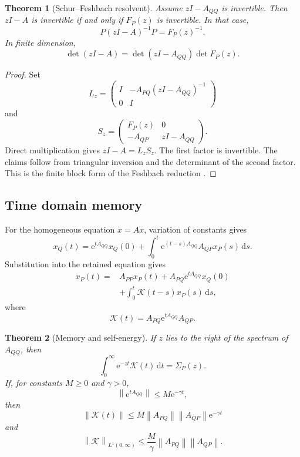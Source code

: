 \documentclass[11pt,letterpaper]{article}
\newtheorem{theorem}{Theorem}[section]
\theoremstyle{plain}
\theoremstyle{plain}
\theoremstyle{plain}
\theoremstyle{definition}
\theoremstyle{definition}
\theoremstyle{definition}
\theoremstyle{definition}
\theoremstyle{definition}
\theoremstyle{remark}
\theoremstyle{remark}
\theoremstyle{remark}
\theoremstyle{remark}
\theoremstyle{remark}
\newcommand{\norm}[1]{\left\lVert#1\right\rVert}
\theoremstyle{remark}
\newcommand{\Kcal}{\mathcal K}
\newcommand{\e}{\mathrm e}
\newcommand{\dd}{\,\mathrm d}
\let\KomorebiPrimitiveMathcal\mathcal
\renewcommand{\mathcal}[1]{{\KomorebiPrimitiveMathcal{#1}}}
\let\KomorebiPrimitivemathrm\mathrm
\renewcommand{\mathrm}[1]{{\KomorebiPrimitivemathrm{#1}}}
\begin{document}
\begin{theorem}[Schur--Feshbach resolvent]\label{extended:record:085}\label{extended:thm:feshbach_resolvent}
Assume \(zI-A_{QQ}\) is invertible. Then \(zI-A\) is invertible if and only if \(F_P(z)\) is invertible. In that case,
\[
P(zI-A)^{-1}P
=
F_P(z)^{-1}.
\]
In finite dimension,
\[
\det(zI-A)
=
\det(zI-A_{QQ})\det F_P(z).
\]
\end{theorem}

\begin{proof}
Set
\[
L_z=
\begin{pmatrix}
I&-A_{PQ}(zI-A_{QQ})^{-1}\\
0&I
\end{pmatrix}
\]
and
\[
S_z=
\begin{pmatrix}
F_P(z)&0\\
-A_{QP}&zI-A_{QQ}
\end{pmatrix}.
\]
Direct multiplication gives \(zI-A=L_zS_z\). The first factor is invertible. The claims follow from triangular inversion and the determinant of the second factor. This is the finite block form of the Feshbach reduction \cite{Feshbach1958}.
\end{proof}

\subsection{Time domain memory}

For the homogeneous equation \(\dot x=Ax\), variation of constants gives
\[
x_Q(t)
=
\e^{tA_{QQ}}x_Q(0)
+
\int_0^t
\e^{(t-s)A_{QQ}}A_{QP}x_P(s)
\dd s.
\]
Substitution into the retained equation gives
\[
\begin{aligned}
\dot x_P(t)
={}&
A_{PP}x_P(t)
+
A_{PQ}\e^{tA_{QQ}}x_Q(0)\\
&+
\int_0^t
\Kcal(t-s)x_P(s)
\dd s,
\end{aligned}
\]
where
\[
\Kcal(t)
=
A_{PQ}\e^{tA_{QQ}}A_{QP}.
\]

\begin{theorem}[Memory and self-energy]\label{extended:record:086}\label{extended:thm:memory_self_energy}
If \(z\) lies to the right of the spectrum of \(A_{QQ}\), then
\[
\int_0^\infty
\e^{-zt}\Kcal(t)\dd t
=
\Sigma_P(z).
\]
If, for constants \(M\geq0\) and \(\gamma>0\),
\[
\norm{\e^{tA_{QQ}}}
\leq
M\e^{-\gamma t},
\]
then
\[
\norm{\Kcal(t)}
\leq
M\norm{A_{PQ}}\norm{A_{QP}}\e^{-\gamma t}
\]
and
\[
\norm{\Kcal}_{L^1(0,\infty)}
\leq
\frac{M}{\gamma}
\norm{A_{PQ}}\norm{A_{QP}}.
\]
\end{theorem}
\end{document}

